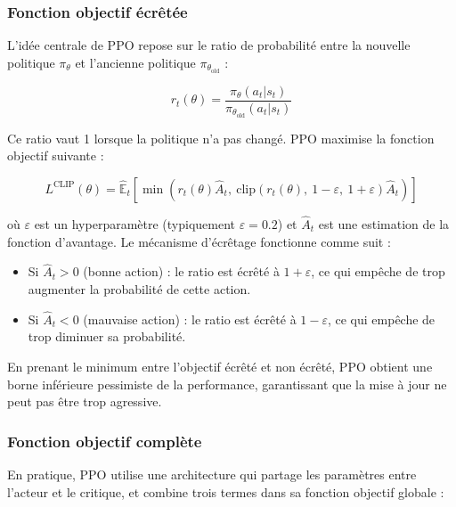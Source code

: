 \subsubsection*{Fonction objectif écrêtée}

L'idée centrale de PPO repose sur le ratio de probabilité entre la nouvelle 
politique $\pi_\theta$ et l'ancienne politique $\pi_{\theta_{\text{old}}}$ :

\begin{equation}
    r_t(\theta) = \frac{\pi_\theta(a_t | s_t)}{\pi_{\theta_{\text{old}}}(a_t | s_t)}
    \label{eq:ppo_ratio}
\end{equation}

Ce ratio vaut 1 lorsque la politique n'a pas changé. PPO maximise la fonction 
objectif suivante :

\begin{equation}
    L^{\text{CLIP}}(\theta) = \hat{\mathbb{E}}_t \left[ 
    \min\left( r_t(\theta)\hat{A}_t,\ 
    \text{clip}(r_t(\theta),\ 1-\varepsilon,\ 1+\varepsilon)\hat{A}_t \right) 
    \right]
    \label{eq:ppo_clip}
\end{equation}

où $\varepsilon$ est un hyperparamètre (typiquement $\varepsilon = 0.2$) et 
$\hat{A}_t$ est une estimation de la fonction d'avantage. Le mécanisme 
d'écrêtage fonctionne comme suit :
\begin{itemize}[noitemsep, topsep=4pt]
    \item Si $\hat{A}_t > 0$ (bonne action) : le ratio est écrêté à 
    $1 + \varepsilon$, ce qui empêche de trop augmenter la probabilité de 
    cette action.
    \item Si $\hat{A}_t < 0$ (mauvaise action) : le ratio est écrêté à 
    $1 - \varepsilon$, ce qui empêche de trop diminuer sa probabilité.
\end{itemize}

En prenant le minimum entre l'objectif écrêté et non écrêté, PPO obtient une 
borne inférieure pessimiste de la performance, garantissant que la mise à jour 
ne peut pas être trop agressive.

\subsubsection*{Fonction objectif complète}

En pratique, PPO utilise une architecture qui partage les paramètres entre 
l'acteur et le critique, et combine trois termes dans sa fonction objectif 
globale :

